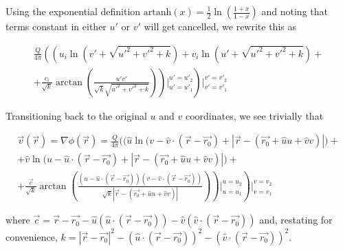 ﻿\documentclass{article}
\begin{document}
Using the exponential definition $\text{artanh}(x) = \frac{1}{2} \ln \left( \frac{1 + x}{1 - x} \right)$ and noting that terms constant in either $u'$ or $v'$ will get cancelled, we rewrite this as

\begin{multline*}
    \frac{Q}{4 \pi} \left( \left( u_i \ln \left( v' + \sqrt{u'^2 + v'^2 + k} \right) + v_i \ln \left( u' + \sqrt{u'^2 + v'^2 + k} \right) + \right. \right. \\
    \left. \left. + \frac{c_i}{\sqrt{k}} \arctan \left( \frac{u' v'}{\sqrt{k} \sqrt{u'^2 + v'^2 + k}} \right) \right) \bigg|_{u' = u'_1}^{u' = u'_2} \right) \bigg|_{v' = v'_1}^{v' = v'_2}
\end{multline*}

Transitioning back to the original $u$ and $v$ coordinates, we see trivially that

\begin{multline}
    \label{eq:SolutionToTheEffectOfARectangularSourcePanelOnTheVelocity}
    \vec{v}(\vec{r}) = \nabla \phi(\vec{r}) = \frac{Q}{4 \pi} \Bigg( \bigg( \hat{u} \ln \big( v - \hat{v} \cdot (\vec{r} - \vec{r_0}) + |\vec{r} - (\vec{r_0} + \hat{u} u + \hat{v} v)| \big) + \\
    + \hat{v} \ln \big( u - \hat{u} \cdot (\vec{r} - \vec{r_0}) + |\vec{r} - (\vec{r_0} + \hat{u} u + \hat{v} v)| \big) + \\
    \left. \left. + \frac{\vec{c}}{\sqrt{k}} \arctan \left( \frac{(u - \hat{u} \cdot (\vec{r} - \vec{r_0})) (v - \hat{v} \cdot (\vec{r} - \vec{r_0}))}{\sqrt{k} |\vec{r} - (\vec{r_0} + \hat{u} u + \hat{v} v)|} \right) \right) \bigg|_{u = u_1}^{u = u_2} \right) \bigg|_{v = v_1}^{v = v_2}
\end{multline}

where $\vec{c} = \vec{r}  - \vec{r_0} - \hat{u} (\hat{u} \cdot (\vec{r} - \vec{r_0})) - \hat{v} (\hat{v} \cdot (\vec{r} - \vec{r_0}))$ and, restating for convenience, $k = |\vec{r} - \vec{r_0}|^2 - (\hat{u} \cdot (\vec{r} - \vec{r_0}))^2 - (\hat{v} \cdot (\vec{r} - \vec{r_0}))^2$.
\end{document}
